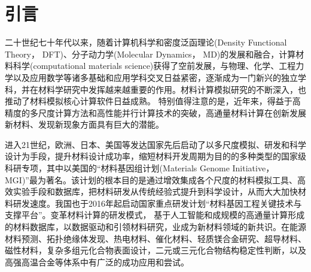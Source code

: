 \section{引言}
二十世纪七十年代以来，随着计算机科学和密度泛函理论\textrm{(Density Functional Theory， DFT)}、分子动力学\textrm{(Molecular Dynamics， MD)}的发展和融合，计算材料科学\textrm{(computational materials science)}获得了空前发展，与物理、化学、工程力学以及应用数学等诸多基础和应用学科交叉日益紧密，逐渐成为一门新兴的独立学科，并在材料学研究中发挥越来越重要的作用。材料计算模拟研究的不断深入，也推动了材料模拟核心计算软件日益成熟。%
特别值得注意的是，近年来，得益于高精度的多尺度计算方法和高性能并行计算技术的突破，高通量材料计算在创新发展新材料、发现新现象方面具有巨大的潜能。

进入21世纪，欧洲、日本、美国等发达国家先后启动了以多尺度模拟、研发和科学设计为手段，提升材料设计成功率，缩短材料开发周期为目的的多种类型的国家级科研专项，其中以美国的“材料基因组计划(Materials Genome Initiative，MGI)”最为著名。该计划的根本目的是通过增效集成各个尺度的材料模拟工具、高效实验手段和数据库，把材料研发从传统经验式提升到科学设计，从而大大加快材料研发速度。我国也于2016年起启动国家重点研发计划“材料基因工程关键技术与支撑平台”。变革材料计算的研发模式，%
基于人工智能和成规模的高通量计算形成的材料数据库，以数据驱动和引领材料研究，业成为新材料领域的新共识。在能源材料预测、拓扑绝缘体发现、热电材料、催化材料、轻质镁合金研究、超导材料、磁性材料，复杂多组元化合物表面设计，二元或三元化合物结构稳定性判断，以及高强高温合金等体系中有广泛的成功应用和尝试。

